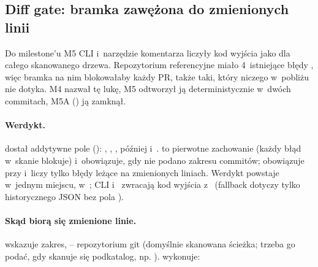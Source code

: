 \subsection{Diff gate: bramka zawężona do zmienionych linii}\label{sec:portcullis-diff-gate}

Do milestone'u M5 CLI i~narzędzie komentarza liczyły kod wyjścia jako
 dla całego skanowanego drzewa. Repozytorium referencyjne miało
4~istniejące błędy , więc bramka na nim
blokowałaby każdy PR, także taki, który niczego w~pobliżu nie dotyka. M4 nazwał tę lukę,
M5 odtworzył ją deterministycznie w~dwóch commitach, M5A ()
ją zamknął.


\paragraph{Werdykt.}  dostał addytywne pole 
(): , , ,
później  i~. 
 to pierwotne zachowanie (każdy błąd w~skanie blokuje) i~obowiązuje, gdy nie
podano zakresu commitów;   obowiązuje przy
 i~liczy tylko błędy leżące na zmienionych liniach. Werdykt
powstaje w~jednym miejscu, w~; CLI i~
zwracają kod wyjścia z~ (fallback dotyczy
tylko historycznego JSON bez pola ).

\paragraph{Skąd biorą się zmienione linie.} 
wskazuje zakres,  -- repozytorium git (domyślnie
skanowana ścieżka; trzeba go podać, gdy skanuje się podkatalog, np. ).
 wykonuje:

